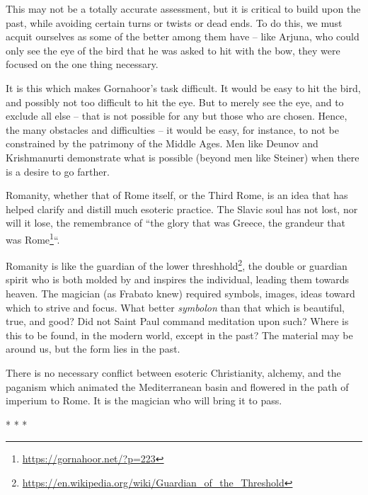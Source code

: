 This may not be a totally accurate assessment, but it is critical to build upon the past, while avoiding certain turns or twists or dead ends. To do this, we must acquit ourselves as some of the better among them have -- like Arjuna, who could only see the eye of the bird that he was asked to hit with the bow, they were focused on the one thing necessary.

It is this which makes Gornahoor's task difficult. It would be easy to hit the bird, and possibly not too difficult to hit the eye. But to merely see the eye, and to exclude all else -- that is not possible for any but those who are chosen. Hence, the many obstacles and difficulties -- it would be easy, for instance, to not be constrained by the patrimony of the Middle Ages. Men like Deunov and Krishmanurti demonstrate what is possible (beyond men like Steiner) when there is a desire to go farther.

Romanity, whether that of Rome itself, or the Third Rome, is an idea that has helped clarify and distill much esoteric practice. The Slavic soul has not lost, nor will it lose, the remembrance of ``the glory that was Greece, the grandeur that was Rome\footnote{\url{https://gornahoor.net/?p=223}}``.

Romanity is like the guardian of the lower threshhold\footnote{\url{https://en.wikipedia.org/wiki/Guardian\_of\_the\_Threshold}}, the double or guardian spirit who is both molded by and inspires the individual, leading them towards heaven. The magician (as Frabato knew) required symbols, images, ideas toward which to strive and focus. What better \emph{symbolon} than that which is beautiful, true, and good? Did not Saint Paul command meditation upon such? Where is this to be found, in the modern world, except in the past? The material may be around us, but the form lies in the past.

There is no necessary conflict between esoteric Christianity, alchemy, and the paganism which animated the Mediterranean basin and flowered in the path of imperium to Rome. It is the magician who will bring it to pass.



\begin{center}* * *\end{center}

